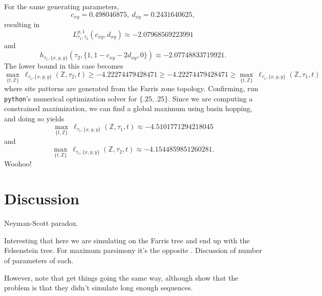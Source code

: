 \documentclass[a4paper]{article}
\newcommand{\fullAncestralStateCategories}{\mathbb{Z}}
\begin{document}
For the same generating parameters,
$$
c_{xy} = 0.498046875, \ d_{xy} = 0.2431640625,
$$
resulting in
$$
L^{p,1}_{\tau_1,\tau_2}(c_{xy},d_{xy}) \approx -2.07968569223991
$$
and
$$
h_{\tau_1,\{x,y,y\}}(\tau_2,\{1, 1-c_{xy}-2d_{xy}, 0\}) \approx -2.07748833719921.
$$
The lower bound in this case becomes
$$
\max_{\{t,\fullAncestralStateCategories\}} \ \ell_{\tau_1,\{x,y,y\}}(\fullAncestralStateCategories,\tau_2,t) \ge -4.22274479428471 \ge -4.22274479428471 \ge \max_{\{t,\fullAncestralStateCategories\}} \ \ell_{\tau_1,\{x,y,y\}}(\fullAncestralStateCategories,\tau_1,t)
$$
where site patterns are generated from the Farris zone topology.
Confirming, run \texttt{python}'s numerical optimization solver for $\{.25, .25\}$.
Since we are computing a constrained maximization, we can find a global maximum using basin hopping, and doing so yields
$$
\max_{\{t,\fullAncestralStateCategories\}} \ \ell_{\tau_1,\{x,y,y\}}(\fullAncestralStateCategories,\tau_1,t) \approx -4.5101771294218045
$$
and
$$
\max_{\{t,\fullAncestralStateCategories\}} \ \ell_{\tau_1,\{x,y,y\}}(\fullAncestralStateCategories,\tau_2,t) \approx -4.1544859851260281.
$$
Woohoo!

\section{Discussion}

Neyman-Scott paradox.

Interesting that here we are simulating on the Farris tree and end up with the Felsenstein tree.
For maximum parsimony it's the opposite \cite{Felsenstein1978-rr}.
Discussion of number of parameters of each.

However, note that \cite{Siddall1998-hq} get things going the same way, although \cite{Swofford2001-hr} show that the problem is that they didn't simulate long enough sequences.



\end{document}
